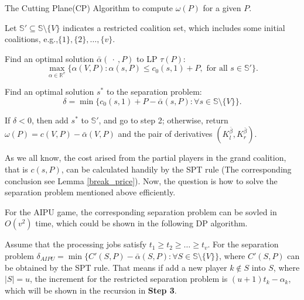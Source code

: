 \begin{algorithm}[H]\label{algoCP}
\caption{The Cutting Plane(CP) Algorithm to compute $\omega(P)$ for a given $P$.}
\begin{algorithmic}[1]

\begin{description}
  \justifying
  \item[Step 1.] Let $\mathbb{S}'\subseteq \mathbb{S}\setminus \{V\}$ indicates a restricted coalition set, which includes some initial coalitions,
  \vspace{10pt}
  e.g.,$ \{1\},\{2\},\ldots,\{v\}$.
  \item[Step 2.] Find an optimal solution $\bar{\alpha}(\ \cdot \ ,P)$ to LP $\tau(P)$:
  \begin{equation*}
  \max_{\alpha\in \mathbb{R}^v} \big\{ \alpha(V,P): \alpha(s,P) \leq c_0(s,1)+P, \mbox{ for all } s \in \mathbb{S}'\big\}.
  \end{equation*}
  \vspace{-11pt}
  \item[Step 3.]
  Find an optimal solution $s^*$ to the separation problem:
  \begin{equation*}
  \delta = \min \big\{ c_0(s,1)+ P -\bar{\alpha}(s,P): \forall s \in \mathbb{S} \setminus \{V\}\big\}.
  \end{equation*}
  \item[Step 4.]
  If $\delta<0$, then add $s^*$ to $\mathbb{S}'$, and go to step 2; otherwise, return $\omega(P)=c(V,P)-\bar{\alpha}(V,P)$ and the pair of derivatives $(K_{l}^{\bar{\beta}},K_{r}^{\bar{\beta}})$.
\end{description}

\end{algorithmic}
\end{algorithm}

As we all know, the cost arised from the partial players in the grand coalition, that is $c(s,P)$, can be calculated handily by the SPT rule (The corresponding conclusion see Lemma \ref{break_price}).
Now, the question is how to solve the separation problem mentioned above efficiently.

\begin{lem}\label{DP_complexity}
  For the AIPU game, the corresponding separation problem can be sovled in $O(v^2)$ time, which could be shown in the following DP algorithm.
\end{lem}

Assume that the processing jobs satisfy $t_1 \geq t_2 \geq \ldots \geq t_v$. For the separation problem $\delta_{AIPU} = \min \big\{ C'(S,P) -\bar{\alpha}(S,P): \forall S \in \mathbb{S} \setminus \{V\}\big\}$, where $C'(S,P)$ can be obtained by the SPT rule. That means if add a new player $k\notin S$ into $S$, where $|S| =u$, the increment for the restricted separation problem is $(u+1)t_k-\alpha_k$, which will be shown in the recursion in \textbf{Step 3}.

